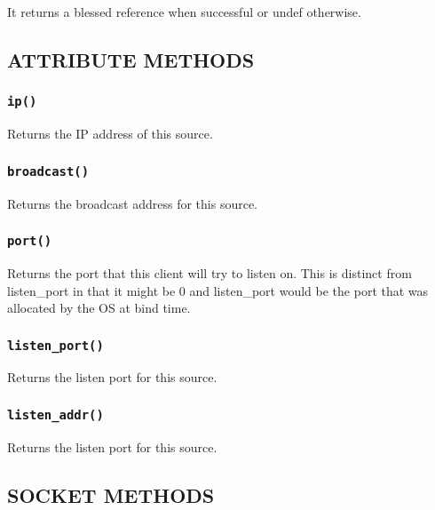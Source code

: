 It returns a blessed reference when successful or undef otherwise.

\subsection*{ATTRIBUTE METHODS\label{xPL::Listener_ATTRIBUTE_METHODS}}
\subsubsection*{\texttt{ip()}\label{xPL::Listener_ip_}}


Returns the IP address of this source.

\subsubsection*{\texttt{broadcast()}\label{xPL::Listener_broadcast_}}


Returns the broadcast address for this source.

\subsubsection*{\texttt{port()}\label{xPL::Listener_port_}}


Returns the port that this client will try to listen on.  This is distinct
from \textsf{listen\_port} in that it might be 0 and \textsf{listen\_port} would be the
port that was allocated by the OS at bind time.

\subsubsection*{\texttt{listen\_port()}\label{xPL::Listener_listen_port_}}


Returns the listen port for this source.

\subsubsection*{\texttt{listen\_addr()}\label{xPL::Listener_listen_addr_}}


Returns the listen port for this source.

\subsection*{SOCKET METHODS\label{xPL::Listener_SOCKET_METHODS}}
